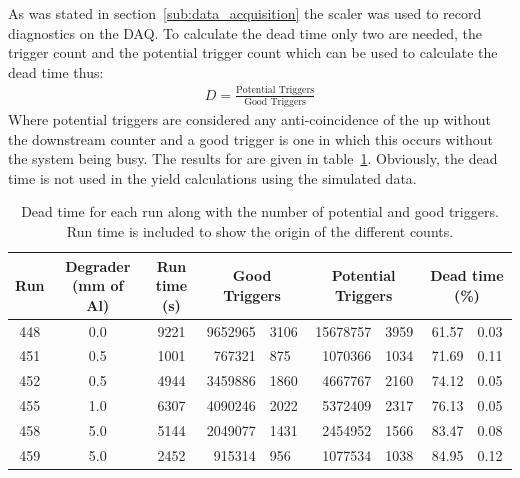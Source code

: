 As was stated in section~\ref{sub:data_acquisition} the scaler was used to record diagnostics on the DAQ. To calculate the dead time only two are needed, the trigger count and the potential trigger count which can be used to calculate the dead time thus:
\begin{align}
    D = \frac{\text{Potential Triggers}}{\text{Good Triggers}}
\end{align}
Where potential triggers are considered any anti-coincidence of the up without the downstream counter and a good trigger is one in which this occurs without the system being busy. The results for are given in table~\ref{tab:dead_time}. Obviously, the dead time is not used in the yield calculations using the simulated data.
\begin{table}
    \begin{center}
    \begin{tabular}{c|c|c|r@{ $\pm$ }l|r@{ $\pm$ }l|r@{ $\pm$ }l }
        Run & Degrader (mm of Al) & Run time (s) &
                              \multicolumn{2}{|c}{Good Triggers} &      
                              \multicolumn{2}{|c}{Potential Triggers} &
                              \multicolumn{2}{|c}{Dead time (\%)} \\
        \hline
        448 & 0.0 & 9221 & 9652965 & 3106 & 15678757 & 3959 & 61.57 & 0.03 \\
        451 & 0.5 & 1001 &  767321 & 875  &  1070366 & 1034 & 71.69 & 0.11 \\
        452 & 0.5 & 4944 & 3459886 & 1860 &  4667767 & 2160 & 74.12 & 0.05 \\
        455 & 1.0 & 6307 & 4090246 & 2022 &  5372409 & 2317 & 76.13 & 0.05 \\
        458 & 5.0 & 5144 & 2049077 & 1431 &  2454952 & 1566 & 83.47 & 0.08 \\
        459 & 5.0 & 2452 &  915314 & 956  &  1077534 & 1038 & 84.95 & 0.12 \\
    \end{tabular}
    \end{center}
    \caption{Dead time for each run along with the number of potential and good triggers. Run time is included to show the origin of the different counts.}
    \label{tab:dead_time}
\end{table}
